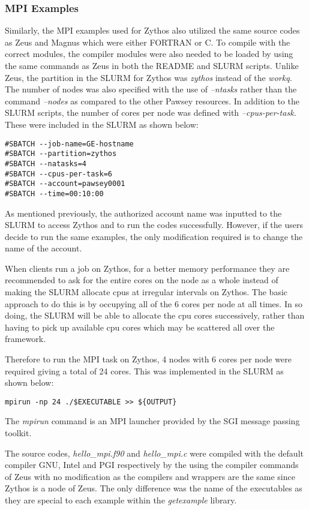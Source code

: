 \subsubsection{MPI Examples}

Similarly, the MPI examples used for Zythos also utilized the same source codes as Zeus and Magnus which were either FORTRAN or C. To compile with the
correct modules, the compiler modules were also needed to be loaded by using the same commands as Zeus in both the README and SLURM scripts. Unlike Zeus, 
the partition in the SLURM for Zythos was \emph{zythos} instead of the \emph{workq.} The number of nodes was also specified with the use of 
\emph{--ntasks} rather than the command \emph{--nodes} as compared to the other Pawsey resources. In addition to the SLURM scripts, the number of cores 
per node was defined with \emph{--cpus-per-task.} These were included in the SLURM as shown below:

\begin{tcolorbox}
\begin{Verbatim}[fontsize=\scriptsize]
#SBATCH --job-name=GE-hostname
#SBATCH --partition=zythos
#SBATCH --natasks=4
#SBATCH --cpus-per-task=6
#SBATCH --account=pawsey0001
#SBATCH --time=00:10:00
\end{Verbatim}
\end{tcolorbox}

As mentioned previously, the authorized account name was inputted to the SLURM to access Zythos and to run the codes successfully. However, if the
users decide to run the same examples, the only modification required is to change the name of the account.

When clients run a job on Zythos, for a better memory performance they are recommended to ask for the entire cores on the node as a whole instead of 
making the SLURM allocate cpus at irregular intervals on Zythos. The basic approach to do this is by occupying all of the 6 cores per node at all times.
In so doing, the SLURM will be able to allocate the cpu cores successively, rather than having to pick up available cpu cores which may be scattered all 
over the framework. 

Therefore to run the MPI task on Zythos, 4 nodes with 6 cores per node were required giving a total of 24 cores. This was implemented 
in the SLURM as shown below:

\begin{tcolorbox}
\begin{Verbatim}[fontsize=\scriptsize]
mpirun -np 24 ./$EXECUTABLE >> ${OUTPUT}
\end{Verbatim}
\end{tcolorbox}

The \emph{mpirun} command is an MPI launcher provided by the SGI message passing toolkit.

The source codes, \emph{hello\_mpi.f90} and \emph{hello\_mpi.c} were compiled with the default compiler GNU, Intel and PGI respectively by the using the 
compiler commands of Zeus with no modification as the compilers and wrappers are the same since Zythos is a node of Zeus. The only difference was the 
name of the executables as they are special to each example within the \emph{getexample} library.
